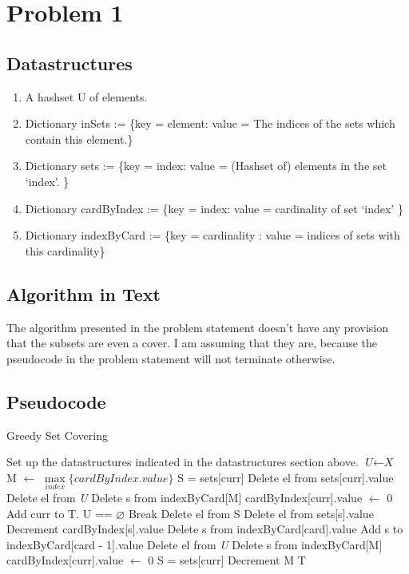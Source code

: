 \documentclass[10pt]{article}
\begin{document}
\section*{Problem 1}
\subsection*{Datastructures}
\begin{enumerate}
\item A hashset U of elements. 
\item Dictionary inSets := \{key = element: value = The indices of the sets which contain this element.\}
\item Dictionary sets := \{key = index: value = (Hashset of) elements in the set `index'. \}
\item Dictionary cardByIndex := \{key = index: value = cardinality of set `index' \}
\item Dictionary indexByCard := \{key = cardinality : value = indices of sets with this cardinality\}
\end{enumerate}
\subsection*{Algorithm in Text}
The algorithm presented in the problem statement doesn't have any provision that the subsets are even a cover. I am assuming that they are, because the pseudocode in the problem statement will not terminate otherwise.

\subsection*{Pseudocode}
\begin{algorithm}
\caption{Greedy Set Covering }\label{euclid}
\begin{algorithmic}[1]
\State Set up the datastructures indicated in the datastructures section above.
\State $\textit{U} \gets \textit{X}$
\State M $\gets$ $\max\limits_{index}\{cardByIndex.value\}$
\State S = sets[curr]
\State Delete el from sets[curr].value
\State Delete el from \textit{U}
\State Delete s from indexByCard[M]
\State cardByIndex[curr].value $\gets$ 0
\EndFor %
\State Add curr to T.
\If U == $\varnothing$
\State Break
\Else
{} %
\State Delete el from S
\State Delete el from sets[s].value
\State Decrement cardByIndex[s].value
\State Delete s from indexByCard[card].value
\State Add s to indexByCard[card - 1].value
\EndFor%
\State Delete el from \textit{U}
\State Delete s from indexByCard[M]
\State cardByIndex[curr].value $\gets$ 0
\EndFor %
\State S = sets[curr]
\EndIf
\EndFor%
\State Decrement M
\EndWhile
\State \Return T
\EndProcedure
\end{algorithmic}
\end{algorithm}
\end{document}
